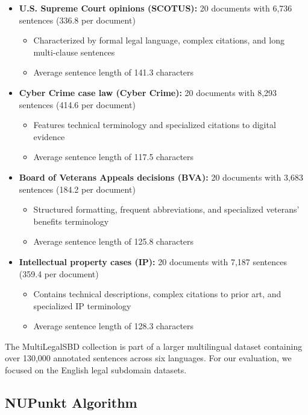 \begin{itemize}
    \item \textbf{U.S. Supreme Court opinions (SCOTUS):} 20 documents with 6,736 sentences (336.8 per document)
    \begin{itemize}
        \item Characterized by formal legal language, complex citations, and long multi-clause sentences
        \item Average sentence length of 141.3 characters
    \end{itemize}
    
    \item \textbf{Cyber Crime case law (Cyber Crime):} 20 documents with 8,293 sentences (414.6 per document)
    \begin{itemize}
        \item Features technical terminology and specialized citations to digital evidence
        \item Average sentence length of 117.5 characters
    \end{itemize}
    
    \item \textbf{Board of Veterans Appeals decisions (BVA):} 20 documents with 3,683 sentences (184.2 per document)
    \begin{itemize}
        \item Structured formatting, frequent abbreviations, and specialized veterans' benefits terminology
        \item Average sentence length of 125.8 characters
    \end{itemize}
    
    \item \textbf{Intellectual property cases (IP):} 20 documents with 7,187 sentences (359.4 per document)
    \begin{itemize}
        \item Contains technical descriptions, complex citations to prior art, and specialized IP terminology
        \item Average sentence length of 128.3 characters
    \end{itemize}
\end{itemize}

The MultiLegalSBD collection is part of a larger multilingual dataset containing over 130,000 annotated sentences across six languages. For our evaluation, we focused on the English legal subdomain datasets.

\subsection{NUPunkt Algorithm}
\label{appendix:NUPunkt}

